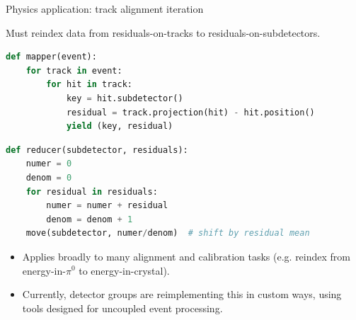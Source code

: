 \documentclass{beamer}
\begin{document}
\begin{frame}[fragile]{Physics application: track alignment iteration}

Must reindex data from residuals-on-tracks to \mbox{residuals-on-subdetectors.\hspace{-1 cm}}

\vfill
\begin{lstlisting}[language=python,frame=single]
def mapper(event):
    for track in event:
        for hit in track:
            key = hit.subdetector()
            residual = track.projection(hit) - hit.position()
            yield (key, residual)
\end{lstlisting}

\begin{lstlisting}[language=python,frame=single]
def reducer(subdetector, residuals):
    numer = 0
    denom = 0
    for residual in residuals:
        numer = numer + residual
        denom = denom + 1
    move(subdetector, numer/denom)  # shift by residual mean
\end{lstlisting}

\vfill
\begin{itemize}
\item Applies broadly to many alignment and calibration tasks (e.g. reindex from energy-in-$\pi^0$ to energy-in-crystal).
\item Currently, detector groups are reimplementing this in custom ways, using tools designed for uncoupled event processing.
\end{itemize}
\end{frame}
\end{document}

